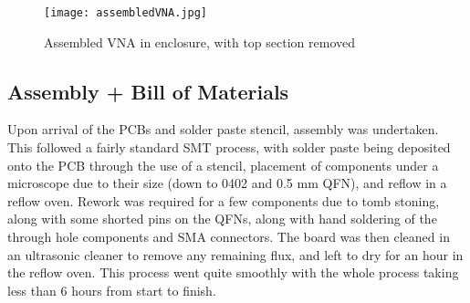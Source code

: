 \begin{figure}[H]
	\centering
	\texttt{[image: assembledVNA.jpg]}
	\caption{Assembled VNA in enclosure, with top section removed}
	\label{fig:pcb_assembled}
\end{figure}

\subsection{Assembly + Bill of Materials}
Upon arrival of the PCBs and solder paste stencil, assembly was undertaken. This followed a fairly standard SMT process, with solder paste being deposited onto the PCB through the use of a stencil, placement of components under a microscope due to their size (down to 0402 and 0.5 mm QFN), and reflow in a reflow oven. Rework was required for a few components due to tomb stoning, along with some shorted pins on the QFNs, along with hand soldering of the through hole components and SMA connectors. The board was then cleaned in an ultrasonic cleaner to remove any remaining flux, and left to dry for an hour in the reflow oven. This process went quite smoothly with the whole process taking less than 6 hours from start to finish. 

